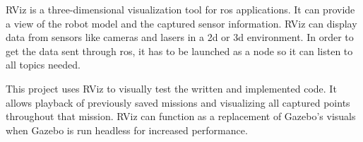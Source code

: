 RViz is a three\hyp{}dimensional visualization tool for \acs{ros} applications. It can provide a view of the robot model and the captured sensor information. RViz can display data from sensors like cameras and lasers in a \acs{2d} or \acs{3d} environment. In order to get the data sent through \acs{ros}, it has to be launched as a node so it can listen to all topics needed. \cite{aws_robomaker_developer_guide}

This project uses RViz to visually test the written and implemented code. It allows playback of previously saved missions and visualizing all captured points throughout that mission. RViz can function as a replacement of Gazebo's visuals when Gazebo is run headless for increased performance.
